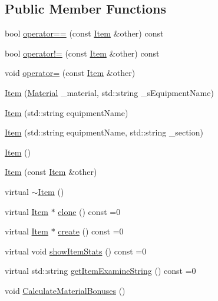 \subsection*{Public Member Functions}
\begin{DoxyCompactItemize}
\item 
bool \mbox{\hyperlink{class_item_a754d81f7346aebb775b16969a89021b4}{operator==}} (const \mbox{\hyperlink{class_item}{Item}} \&other) const
\item 
bool \mbox{\hyperlink{class_item_a612c595b62d2f7b9c5cd2b085a14b365}{operator!=}} (const \mbox{\hyperlink{class_item}{Item}} \&other) const
\item 
void \mbox{\hyperlink{class_item_a47267a43bfae3f28e183170f45783da5}{operator=}} (const \mbox{\hyperlink{class_item}{Item}} \&other)
\item 
\mbox{\hyperlink{class_item_a931e8f47fe5a367166280f28edca3950}{Item}} (\mbox{\hyperlink{class_material}{Material}} \+\_\+material, std\+::string \+\_\+s\+Equipment\+Name)
\item 
\mbox{\hyperlink{class_item_aa7071a91f151036f7fd1a87e12a07f83}{Item}} (std\+::string equipment\+Name)
\item 
\mbox{\hyperlink{class_item_ac84b16ca0e3ce8554dbd817d62bcbab0}{Item}} (std\+::string equipment\+Name, std\+::string \+\_\+section)
\item 
\mbox{\hyperlink{class_item_a297720c02984eab37332ae795d22189d}{Item}} ()
\item 
\mbox{\hyperlink{class_item_a44f7e3f580bd6c0fa2e1c288dff484be}{Item}} (const \mbox{\hyperlink{class_item}{Item}} \&other)
\item 
virtual \mbox{\hyperlink{class_item_a33cc9c0bc556b5a33a9d0d58d37c602b}{$\sim$\+Item}} ()
\item 
virtual \mbox{\hyperlink{class_item}{Item}} $\ast$ \mbox{\hyperlink{class_item_a6d963581e2caad2e08979683a827f39f}{clone}} () const =0
\item 
virtual \mbox{\hyperlink{class_item}{Item}} $\ast$ \mbox{\hyperlink{class_item_a17b3fa0cef44ada961e0d3c65e1de864}{create}} () const =0
\item 
virtual void \mbox{\hyperlink{class_item_aaf7dae41afdce432c11261043e8e4e30}{show\+Item\+Stats}} () const =0
\item 
virtual std\+::string \mbox{\hyperlink{class_item_a00e06647e1adeb62f2d95044476126ac}{get\+Item\+Examine\+String}} () const =0
\item 
void \mbox{\hyperlink{class_item_a8f02bc86b6f66142e35a660a5c28ba74}{Calculate\+Material\+Bonuses}} ()

\end{DoxyCompactItemize}
